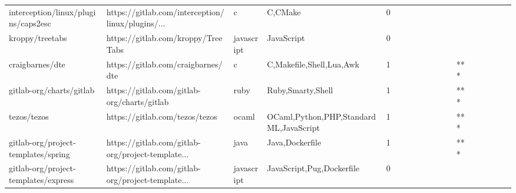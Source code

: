 \begin{tabular}{llllrlllllllllllll}
interception/linux/plugins/caps2esc                &  https://gitlab.com/interception/linux/plugins/... &                 c &                                            C,CMake &       0 &         &        &           &                &                 &        &           &           &          &          &       &              &          \\
kroppy/treetabs                                    &                 https://gitlab.com/kroppy/TreeTabs &        javascript &                                         JavaScript &       0 &         &        &           &                &                 &        &           &           &          &          &       &              &          \\
craigbarnes/dte                                    &                 https://gitlab.com/craigbarnes/dte &                 c &                           C,Makefile,Shell,Lua,Awk &       1 &         &        &           &                &                 &        &           &       *** &          &          &       &              &          \\
gitlab-org/charts/gitlab                           &        https://gitlab.com/gitlab-org/charts/gitlab &              ruby &                                  Ruby,Smarty,Shell &       1 &         &        &           &                &                 &        &           &       *** &          &          &       &              &          \\
tezos/tezos                                        &                     https://gitlab.com/tezos/tezos &             ocaml &            OCaml,Python,PHP,Standard ML,JavaScript &       1 &         &        &           &                &                 &        &           &       *** &          &          &       &              &          \\
gitlab-org/project-templates/spring                &  https://gitlab.com/gitlab-org/project-template... &              java &                                    Java,Dockerfile &       1 &         &        &           &                &                 &        &           &       *** &          &          &       &              &          \\
gitlab-org/project-templates/express               &  https://gitlab.com/gitlab-org/project-template... &        javascript &                          JavaScript,Pug,Dockerfile &       0 &         &        &           &                &                 &        &           &           &          &          &       &              &          \\

\end{tabular}
